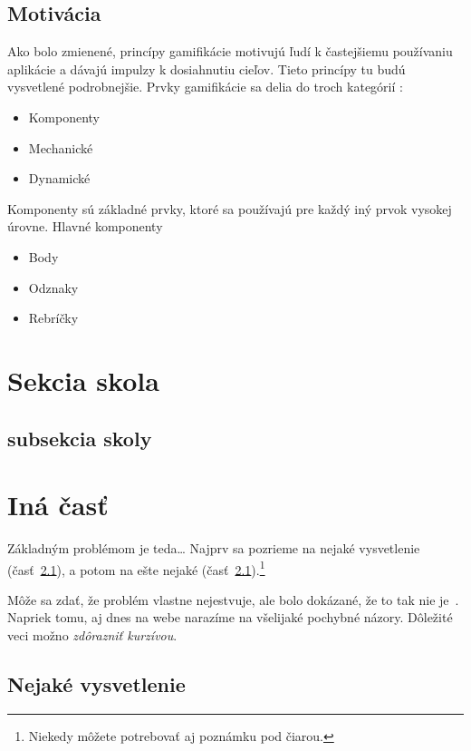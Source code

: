 \documentclass[10pt,twoside,slovak,a4paper]{coursepaper}
\begin{document}
\subsection{Motivácia}
Ako bolo zmienené, princípy gamifikácie motivujú ľudí k častejšiemu používaniu aplikácie a dávajú impulzy k dosiahnutiu cieľov. Tieto princípy tu budú vysvetlené podrobnejšie. 
Prvky gamifikácie sa delia do troch kategórií :
\begin{itemize}
  \item {Komponenty}
  \item {Mechanické}
  \item {Dynamické}
\end{itemize}
Komponenty sú základné prvky, ktoré sa používajú pre každý iný prvok vysokej úrovne. Hlavné komponenty
\begin{itemize}
  \item {Body}
  \item {Odznaky}
  \item {Rebríčky}
\end{itemize}
\section{Sekcia skola}
\subsection{subsekcia skoly}


\cite{Coplien:MPD}

\section{Iná časť} \label{ina}

Základným problémom je teda\ldots{} Najprv sa pozrieme na nejaké vysvetlenie (časť~\ref{ina:nejake}), a potom na ešte nejaké (časť~\ref{ina:nejake}).\footnote{Niekedy môžete potrebovať aj poznámku pod čiarou.}

Môže sa zdať, že problém vlastne nejestvuje\cite{Coplien:MPD}, ale bolo dokázané, že to tak nie je~\cite{Czarnecki:Staged, Czarnecki:Progress}. Napriek tomu, aj dnes na webe narazíme na všelijaké pochybné názory\cite{PLP-Framework}. Dôležité veci možno \emph{zdôrazniť kurzívou}.


\subsection{Nejaké vysvetlenie} \label{ina:nejake}
\end{document}
